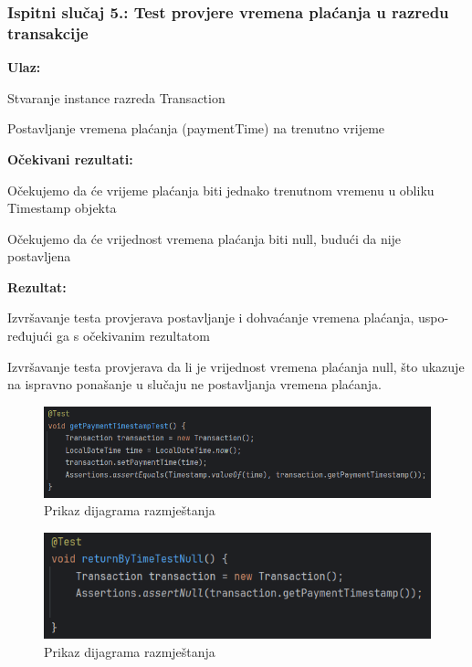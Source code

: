      
			\subsubsection{Ispitni slučaj 5.: Test provjere vremena plaćanja u razredu transakcije}
			
			
			\noindent \textbf{Ulaz:}
			\begin{packed_item}
				\item Stvaranje instance razreda Transaction
				\item Postavljanje vremena plaćanja (paymentTime) na trenutno vrijeme
			\end{packed_item}
			
			\noindent \textbf{Očekivani rezultati:}
			\begin{packed_item}
				\item Očekujemo da će vrijeme plaćanja biti jednako trenutnom vremenu u obliku Timestamp objekta
				\item Očekujemo da će vrijednost vremena plaćanja biti null, budući da nije postavljena
			\end{packed_item}
			\noindent \textbf{Rezultat:}
			\begin{packed_item}
				\item  Izvršavanje testa provjerava postavljanje i dohvaćanje vremena plaćanja, uspo- ređujući ga s očekivanim rezultatom
				\item Izvršavanje testa provjerava da li je vrijednost vremena plaćanja null, što ukazuje na ispravno ponašanje u slučaju ne postavljanja vremena plaćanja.
			\end{packed_item}
			
			\begin{figure} [H]
				\centering
				\includegraphics[width=0.7\linewidth]{slike/TransactionTest.png}
				\caption{Prikaz dijagrama razmještanja}
				\label{fig:Prikaz dijagrama razmještanja}
			\end{figure}
			\begin{figure} [H]
				\centering
				\includegraphics[width=0.7\linewidth]{slike/TransactionTest1.png}
				\caption{Prikaz dijagrama razmještanja}
				\label{fig:Prikaz dijagrama razmještanja}
			\end{figure}

